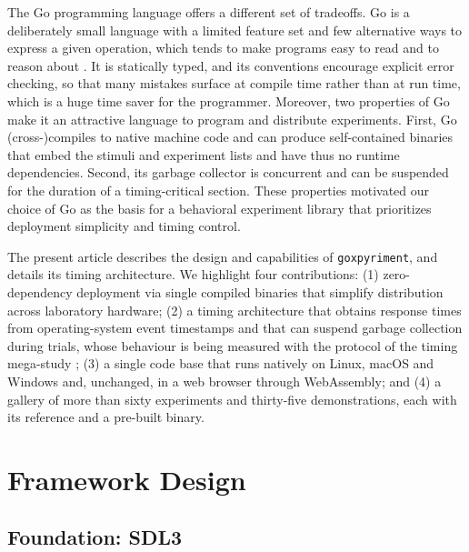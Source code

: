 \documentclass[doc,a4paper,floatsintext]{apa7}
\begin{document}
The Go programming language \parencite{golang} offers a different set
of tradeoffs. Go is a deliberately small language with a limited
feature set and few alternative ways to express a given operation,
which tends to make programs easy to read and to reason about
\parencite{donovan2016}. It is statically typed, and its conventions
encourage explicit error checking, so that many mistakes surface at
compile time rather than at run time, which is a huge time saver for
the programmer.  Moreover, two properties of Go make it an
attractive language to program and distribute experiments.  First, Go
(cross-)compiles to native machine code and can produce self-contained
binaries that embed the stimuli and experiment lists and have thus no
runtime dependencies. Second, its garbage collector is concurrent and
can be suspended for the duration of a timing-critical section. These
properties motivated our choice of Go as the basis for a behavioral
experiment library that prioritizes deployment simplicity and timing
control.

The present article describes the design and capabilities of
\texttt{goxpyriment}, and details its timing architecture. We highlight four
contributions: (1) zero-dependency deployment via single compiled
binaries that simplify distribution across laboratory hardware; (2) a
timing architecture that obtains response times from operating-system
event timestamps and that can suspend garbage collection during
trials, whose behaviour is being measured with the protocol of the timing
mega-study \parencite{bridges2020}; (3) a single code base that runs
natively on Linux, macOS and Windows and, unchanged, in a web browser
through WebAssembly; and (4) a gallery of more than sixty
experiments and thirty-five demonstrations, each with its reference
and a pre-built binary.

{\small

\par}

\section{Framework Design}\label{framework-design}

\subsection{Foundation: SDL3}
\end{document}
